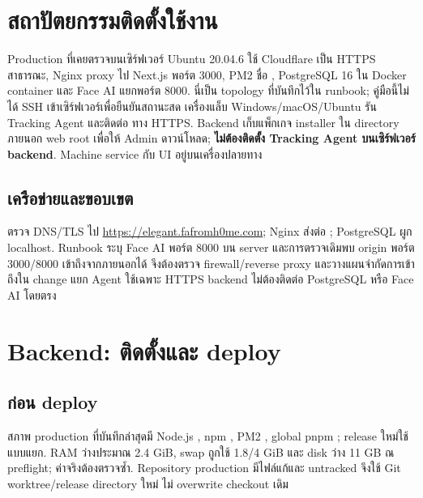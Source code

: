 \chapter{สถาปัตยกรรมติดตั้งใช้งาน}
Production ที่เคยตรวจบนเซิร์ฟเวอร์ Ubuntu 20.04.6 ใช้ Cloudflare เป็น HTTPS สาธารณะ, Nginx proxy ไป Next.js พอร์ต 3000, PM2 ชื่อ , PostgreSQL 16 ใน Docker container  และ Face AI แยกพอร์ต 8000. นี่เป็น topology ที่บันทึกไว้ใน runbook; คู่มือนี้ไม่ได้ SSH เข้าเซิร์ฟเวอร์เพื่อยืนยันสถานะสด
เครื่องแล็บ Windows/macOS/Ubuntu รัน Tracking Agent และติดต่อ  ทาง HTTPS. Backend เก็บแพ็กเกจ installer ใน directory ภายนอก web root เพื่อให้ Admin ดาวน์โหลด; \textbf{ไม่ต้องติดตั้ง Tracking Agent บนเซิร์ฟเวอร์ backend}. Machine service กับ UI อยู่บนเครื่องปลายทาง
\section*{เครือข่ายและขอบเขต}
ตรวจ DNS/TLS ไป \url{https://elegant.fafromh0me.com}; Nginx ส่งต่อ ; PostgreSQL ผูก localhost. Runbook ระบุ Face AI พอร์ต 8000 บน server และการตรวจเดิมพบ origin พอร์ต 3000/8000 เข้าถึงจากภายนอกได้ จึงต้องตรวจ firewall/reverse proxy และวางแผนจำกัดการเข้าถึงใน change แยก Agent ใช้เฉพาะ HTTPS backend ไม่ต้องติดต่อ PostgreSQL หรือ Face AI โดยตรง

\chapter{Backend: ติดตั้งและ deploy}
\section*{ก่อน deploy}
สภาพ production ที่บันทึกล่าสุดมี Node.js , npm , PM2 , global pnpm ; release ใหม่ใช้  แบบแยก. RAM ว่างประมาณ 2.4 GiB, swap ถูกใช้ 1.8/4 GiB และ disk ว่าง 11 GB ณ preflight; ค่าจริงต้องตรวจซ้ำ. Repository production มีไฟล์แก้และ untracked จึงใช้ Git worktree/release directory ใหม่ ไม่ overwrite checkout เดิม

